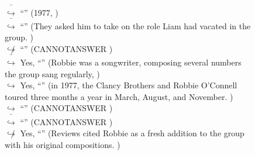\documentclass[11pt,a4paper, onecolumn]{article}
\begin{document}
\begin{figure}[t] \small \begin{tcolorbox}[boxsep=0pt,left=5pt,right=0pt,top=2pt,colback = yellow!5] \begin{dialogue}
 \small 
\colorbox{pink!25}{ $\bar{\hookrightarrow}$}
{ ``'' (1977, ) }
\\
\colorbox{pink!25}{ $\bar{\hookrightarrow}$}
{ ``'' (They asked him to take on the role Liam had vacated in the group. ) }
\\
\colorbox{pink!25}{$\not\hookrightarrow$}
{ ``'' (CANNOTANSWER ) }
\\
\colorbox{pink!25}{ $\bar{\hookrightarrow}$}
\colorbox{red!25}{Yes,}
{ ``'' (Robbie was a songwriter, composing several numbers the group sang regularly, ) }
\\
\colorbox{pink!25}{$\hookrightarrow$}
\colorbox{red!25}{Yes,}
{ ``'' (in 1977, the Clancy Brothers and Robbie O'Connell toured three months a year in March, August, and November. ) }
\\
\colorbox{pink!25}{$\hookrightarrow$}
{ ``'' (CANNOTANSWER ) }
\\
\colorbox{pink!25}{ $\bar{\hookrightarrow}$}
{ ``'' (CANNOTANSWER ) }
\\
\colorbox{pink!25}{$\not\hookrightarrow$}
\colorbox{red!25}{Yes,}
{ ``'' (Reviews cited Robbie as a fresh addition to the group with his original compositions. ) }
\\
 \end{dialogue}\end{tcolorbox}\end{figure}
\end{document}
